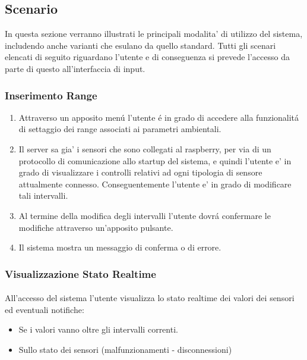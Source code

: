 \subsection{Scenario}

In questa sezione verranno illustrati le principali modalita' di utilizzo del sistema, includendo anche varianti che esulano da quello standard. Tutti gli scenari elencati di seguito riguardano l'utente e di conseguenza si prevede l'accesso da parte di questo all'interfaccia di input.

\subsubsection{Inserimento Range}

\begin{enumerate}
  \item Attraverso un apposito men\'u l'utente \'e in grado di accedere alla funzionalit\'a di settaggio dei range associati ai parametri ambientali.
  \item Il server sa gia' i sensori che sono collegati al raspberry, per via di un protocollo di comunicazione allo startup del sistema, e quindi l'utente e' in grado di visualizzare i controlli relativi ad ogni tipologia di sensore attualmente connesso. Conseguentemente l'utente e' in grado di modificare tali intervalli.
  \item Al termine della modifica degli intervalli l'utente dovr\'a confermare le modifiche attraverso un'apposito pulsante.
  \item Il sistema mostra un messaggio di conferma o di errore.
\end{enumerate}

\subsubsection{Visualizzazione Stato Realtime}

\paragraph{} All'accesso del sistema l'utente visualizza lo stato realtime dei valori dei sensori ed eventuali notifiche:
\begin{itemize}
  \item Se i valori vanno oltre gli intervalli correnti.
  \item Sullo stato dei sensori (malfunzionamenti - disconnessioni)
\end{itemize}

